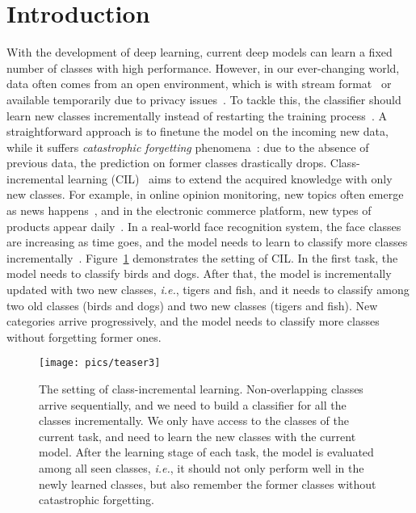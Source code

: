 \documentclass[sigconf]{acmart}
\newcommand{\ie}{\emph{i.e.}}
\begin{document}
\section{Introduction}
With the development of deep learning, current deep models can learn a fixed number of classes with high performance. However, in our ever-changing world, data often comes from an open environment, which is  with stream format~\cite{golab2003issues} or available temporarily due to privacy issues~\cite{de2019continual}.
To tackle this, the classifier should learn new classes incrementally instead of restarting the training process~\cite{li2017learning}. A straightforward approach is to finetune the model on the incoming new data, while it suffers \emph{catastrophic forgetting} phenomena~\cite{mccloskey1989catastrophic}: due to the absence of previous data, the prediction on former classes drastically drops. Class-incremental learning (CIL)~\cite{rebuffi2017icarl} aims to extend the acquired knowledge with only new classes. 
For example, in online opinion
monitoring, new topics often emerge as news happens~\cite{masud2010}, and in the electronic commerce platform, new types of products appear daily~\cite{luo2020alicoco,xu2019open}. 
In a real-world face recognition system, the face classes are increasing as time goes, and the model needs to learn to classify more classes incrementally~\cite{zheng2020learning}. 
Figure~\ref{figure:incremental} demonstrates the setting of CIL. In the first task, the model needs to classify  birds and dogs. After that, the model is incrementally updated with two new classes, \ie, tigers and fish, and it needs to classify among two old classes (birds and dogs) and two new classes (tigers and fish). New categories arrive progressively, and the model needs to classify more classes without forgetting former ones.



\begin{figure}[t]
	\begin{center}
		\texttt{[image: pics/teaser3]}
	\end{center}
	\vspace{-3mm}
	\caption{\small  The setting of class-incremental learning. Non-overlapping classes arrive sequentially, and we need to build a classifier for all the classes incrementally. We only have access to the classes of the current task, and need to learn the new classes with the current model. After the learning stage of each task, the model is evaluated among all seen classes, \ie, it should not only perform well in the newly learned classes, but also remember the former  classes without catastrophic forgetting.
	} \label{figure:incremental}
\end{figure}
\end{document}
